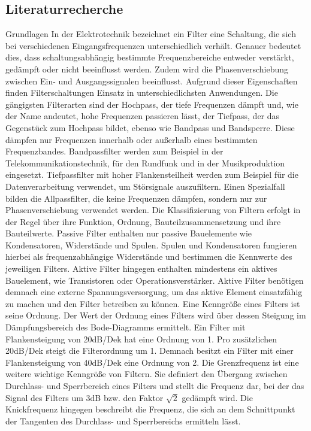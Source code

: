 \subsection{Literaturrecherche}
Grundlagen
In der Elektrotechnik bezeichnet ein Filter eine Schaltung, die sich bei verschiedenen Eingangsfrequenzen unterschiedlich verhält. Genauer bedeutet dies, dass schaltungsabhängig bestimmte Frequenzbereiche entweder verstärkt, gedämpft oder nicht beeinflusst werden. Zudem wird die Phasenverschiebung zwischen Ein- und Ausgangssignalen beeinflusst. Aufgrund dieser Eigenschaften finden Filterschaltungen Einsatz in unterschiedlichsten Anwendungen. Die gängigsten Filterarten sind der Hochpass, der tiefe Frequenzen dämpft und, wie der Name andeutet, hohe Frequenzen passieren lässt, der Tiefpass, der das Gegenstück zum Hochpass bildet, ebenso wie Bandpass und Bandsperre. Diese dämpfen nur Frequenzen innerhalb oder außerhalb eines bestimmten Frequenzbandes.
Bandpassfilter werden zum Beispiel in der Telekommunikationstechnik, für den Rundfunk und in der Musikproduktion eingesetzt. Tiefpassfilter mit hoher Flankensteilheit werden zum Beispiel für die Datenverarbeitung verwendet, um Störsignale auszufiltern. Einen Spezialfall bilden die Allpassfilter, die keine Frequenzen dämpfen, sondern nur zur Phasenverschiebung verwendet werden.
Die Klassifizierung von Filtern erfolgt in der Regel über ihre Funktion, Ordnung, Bauteilzusammensetzung und ihre Bauteilwerte. Passive Filter enthalten nur passive Bauelemente wie Kondensatoren, Widerstände und Spulen. Spulen und Kondensatoren fungieren hierbei als frequenzabhängige Widerstände und bestimmen die Kennwerte des jeweiligen Filters. Aktive Filter hingegen enthalten mindestens ein aktives Bauelement, wie Transistoren oder Operationsverstärker. Aktive Filter benötigen demnach eine externe Spannungsversorgung, um das aktive Element einsatzfähig zu machen und den Filter betreiben zu können.
Eine Kenngröße eines Filters ist seine Ordnung. Der Wert der Ordnung eines Filters wird über dessen Steigung im Dämpfungsbereich des Bode-Diagramms ermittelt. Ein Filter mit Flankensteigung von 20dB/Dek hat eine Ordnung von 1. Pro zusätzlichen 20dB/Dek steigt die Filterordnung um 1. Demnach besitzt ein Filter mit einer Flankensteigung von 40dB/Dek eine Ordnung von 2. 
Die Grenzfrequenz ist eine weitere wichtige Kenngröße von Filtern. Sie definiert den Übergang zwischen Durchlass- und Sperrbereich eines Filters und stellt die Frequenz dar, bei der das Signal des Filters um 3dB bzw. den Faktor $\sqrt{2}$ gedämpft wird.
Die Knickfrequenz hingegen beschreibt die Frequenz, die sich an dem Schnittpunkt der Tangenten des Durchlass- und Sperrbereichs ermitteln lässt.
